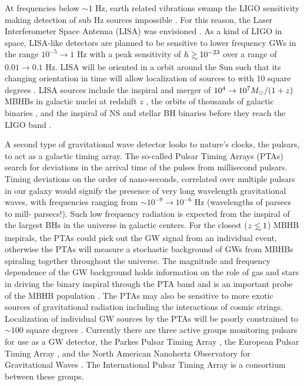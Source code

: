 At frequencies below $\sim 1$ Hz, earth related vibrations swamp the LIGO
sensitivity making detection of sub Hz sources impossible \citep{}. For this
reason, the Laser Interferometer Space Antenna (LISA) was envisioned
\citep{LISAbeginnings}.  As a kind of LIGO in space, LISA-like detectors are
planned to be sensitive to lower frequency GWs in the range $10^{-5}
\rightarrow 1$ Hz with a peak sensitivity of $h \gsim 10^{-23}$ over a range
of $0.01 \rightarrow 0.1$ Hz. LISA will be oriented in a orbit around the Sun
such that its changing orientation in time will allow localization of sources
to with 10 square degrees \citep{}. LISA sources include the inspiral and
merger of $10^4 \rightarrow 10^7 {M_{\odot}}/(1+z)$ MBHBs in galactic nuclei at
redshift $z$ \citep{}, the orbits of thousands of galactic binaries \citep{},
and the inspiral of NS and stellar BH binaries before they reach the LIGO band
\citep{Sesana:2016:LIGOLISA and refs therein}.


A second type of gravitational wave detector looks to nature's clocks, the
pulsars, to act as a galactic timing array. The so-called Pulsar Timing Arrays
(PTAs) search for deviations in the arrival time of the pulses from
millisecond pulsars. Timing deviations on the order of nano-seconds,
correlated over multiple pulsars in our galaxy would signify the presence of
very long wavelength gravitational waves, with frequencies ranging from
$\sim10^{-9} \rightarrow 10^{-6}$ Hz (wavelengths of parsecs to mill-
parsecs!). Such low frequency radiation is expected from the inspiral of the
largest BHs in the universe in galactic centers. For the closest ($z\lsim1$)
MBHB inspirals, the PTAs could pick out the GW signal from an individual
event, otherwise the PTAs will measure a stochastic background of GWs from
MBHBs spiraling together throughout the universe. The magnitude and frequency
dependence of the GW background holds information on the role of gas and stars
in driving the binary inspiral through the PTA band and is an important probe
of the MBHB population \citep[\textit{e.g.}][]{}. The PTAs may also be
sensitive to more exotic sources of gravitational radiation including the
interactions of cosmic strings. Localization of individual GW sources by the
PTAs will be poorly constrained to $\sim 100$ square degrees \citep{}.
Currently there are three active groups monitoring pulsars for use as a GW
detector, the Parkes Pulsar Timing Array \citep[PPTA][]{PPTA}, the European
Pulsar Timing Array \citep[EPTA][]{EPTA}, and the North American Nanohertz
Observatory for Gravitational Waves \citep[NANOGrav][]{NANOGrav}. The
International Pulsar Timing Array \citep[iPTA][]{iPTA} is a consortium between
these groups.





